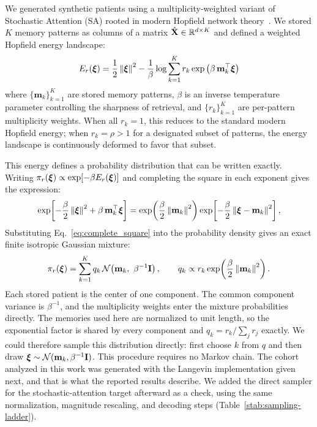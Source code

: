 We generated synthetic patients using a multiplicity-weighted variant of Stochastic
Attention (SA) rooted in modern Hopfield network theory~\citep{Ramsauer2021}. We
stored $K$ memory patterns as columns of a matrix $\hat{\mathbf{X}}\in\mathbb{R}^{d\times K}$ and
defined a weighted Hopfield energy landscape:
\begin{equation}
    E_r(\boldsymbol{\xi}) = \frac{1}{2}\left\lVert \boldsymbol{\xi} \right\rVert^2
    - \frac{1}{\beta}\log\sum_{k=1}^{K} r_k \exp\left(\beta\,\mathbf{m}_k^\top\boldsymbol{\xi}\right)
    \label{eq:hopfield_energy}
\end{equation}
where $\{\mathbf{m}_k\}_{k=1}^K$ are stored memory patterns, $\beta$ is an inverse
temperature parameter controlling the sharpness of retrieval, and $\{r_k\}_{k=1}^K$
are per-pattern multiplicity weights. When all $r_k = 1$, this reduces to the standard
modern Hopfield energy; when $r_k = \rho > 1$ for a designated subset of patterns, the
energy landscape is continuously deformed to favor that subset.

This energy defines a probability distribution that can be written exactly. Writing
$\pi_r(\boldsymbol{\xi})\propto\exp[-\beta E_r(\boldsymbol{\xi})]$ and completing the square in each exponent gives
the expression:
\begin{equation}
    \exp\!\left[-\frac{\beta}{2}\left\lVert \boldsymbol{\xi} \right\rVert^2 + \beta\,\mathbf{m}_k^\top\boldsymbol{\xi}\right]
    = \exp\!\left(\frac{\beta}{2}\left\lVert \mathbf{m}_k \right\rVert^2\right)
      \exp\!\left[-\frac{\beta}{2}\left\lVert \boldsymbol{\xi}-\mathbf{m}_k \right\rVert^2\right],
    \label{eq:complete_square}
\end{equation}
Substituting Eq.~\eqref{eq:complete_square} into the probability density gives an exact
finite isotropic Gaussian mixture:
\begin{equation}
    \pi_r(\boldsymbol{\xi}) = \sum_{k=1}^{K} q_k\,
    \mathcal{N}\!\left(\mathbf{m}_k,\ \beta^{-1}\mathbf{I}\right),
    \qquad
    q_k \propto r_k\exp\!\left(\frac{\beta}{2}\left\lVert \mathbf{m}_k \right\rVert^2\right).
    \label{eq:exact_mixture}
\end{equation}
Each stored patient is the center of one component. The common component variance is
$\beta^{-1}$, and the multiplicity weights enter the mixture probabilities directly. The
memories used here are normalized to unit length, so the exponential factor is shared by
every component and $q_k = r_k/\sum_j r_j$ exactly. We could therefore sample this
distribution directly: first choose $k$ from $q$ and then draw
$\boldsymbol{\xi}\sim\mathcal{N}(\mathbf{m}_k,\beta^{-1}\mathbf{I})$. This procedure requires no Markov
chain. The cohort
analyzed in this work was generated with the Langevin implementation given next, and that is
what the reported results describe. We added the direct sampler for the stochastic-attention
target afterward as a check,
using the same normalization, magnitude rescaling, and decoding steps
(Table~\ref{stab:sampling-ladder}).

